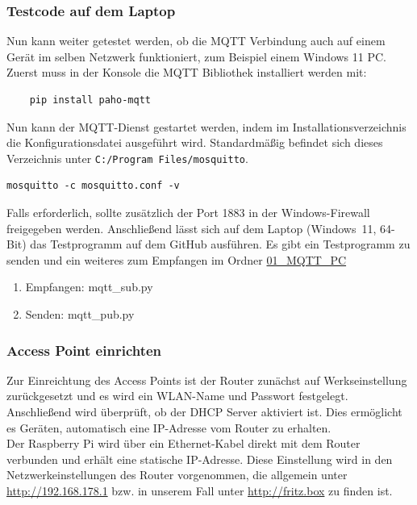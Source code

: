\subsubsection{Testcode auf dem Laptop}
Nun kann weiter getestet werden, ob die MQTT Verbindung auch auf einem Gerät im selben Netzwerk funktioniert, zum Beispiel einem Windows 11 PC. 
Zuerst muss in der Konsole die MQTT Bibliothek installiert werden mit:
\begin{lstlisting}
    pip install paho-mqtt
\end{lstlisting}
Nun kann der MQTT-Dienst gestartet werden, indem im Installationsverzeichnis die Konfigurationsdatei ausgeführt wird. Standardmäßig befindet sich dieses Verzeichnis unter
\texttt{C:/Program Files/mosquitto}.

\begin{lstlisting}
mosquitto -c mosquitto.conf -v
\end{lstlisting}
Falls erforderlich, sollte zusätzlich der Port 1883 in der Windows-Firewall freigegeben werden. Anschließend lässt sich auf dem Laptop (Windows~11, 64-Bit) das Testprogramm auf dem GitHub ausführen. Es gibt ein Testprogramm zu senden und ein weiteres zum Empfangen im Ordner \href{https://github.com/NiklasFelhauer/Projektarbeit_AR_App/tree/main/01_MQTT_PC}{01\_MQTT\_PC}

\begin{enumerate}
    \item Empfangen: mqtt\_sub.py
    \item Senden: mqtt\_pub.py 
\end{enumerate}


\subsubsection{Access Point einrichten}
Zur Einreichtung des Access Points ist der Router zunächst auf Werkseinstellung zurückgesetzt und es wird ein WLAN-Name und Passwort festgelegt. Anschließend wird überprüft, ob der DHCP Server aktiviert ist. Dies ermöglicht es Geräten, automatisch eine IP-Adresse vom Router zu erhalten.\\
Der Raspberry Pi wird über ein Ethernet-Kabel direkt mit dem Router verbunden und erhält eine statische IP-Adresse. Diese Einstellung wird in den Netzwerkeinstellungen des Router vorgenommen, die allgemein unter \url{http://192.168.178.1} bzw. in unserem Fall unter \url{http://fritz.box} zu finden ist.


